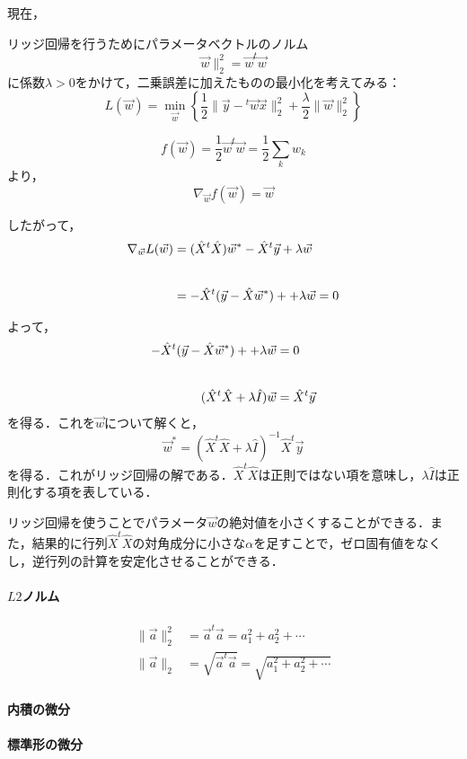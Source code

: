 現在，

リッジ回帰を行うためにパラメータベクトルのノルム
\begin{equation}
    \vec{w}\|^2_2 = \vec{w}^t\vec{w}
\end{equation}
に係数$\lambda > 0$をかけて，二乗誤差に加えたものの最小化を考えてみる：
\begin{equation}
    L(\vec{w}) =
    \min_{\vec{w}}
    \left\{
        \frac{1}{2}\|\vec{y}-{}^t\vec{w}\vec{x}\|^2_2 + \frac{\lambda}{2}\|\vec{w}\|^2_2
    \right\}
\end{equation}


\begin{equation}
    f(\vec{w}) = \frac{1}{2}\vec{w}^t\vec{w}
    = \frac{1}{2}\sum_k w_k
\end{equation}
より，
\begin{equation}
    \nabla_{\vec{w}}f(\vec{w}) = \vec{w}
\end{equation}

したがって，
\begin{align}
    \nabla_{\vec{w}}L(\vec{w})
    & = (\hat{X}^t\hat{X})\vec{w}^\ast 
    - \hat{X}^t\vec{y}
    +\lambda\vec{w}\notag \\\\[5pt]
    & = -\hat{X}^t (\vec{y} - \hat{X}\vec{w}^\ast)
    + +\lambda\vec{w} = 0
\end{align}

よって，
\begin{align}
    -\hat{X}^t (\vec{y} - \hat{X}\vec{w}^\ast)
    + +\lambda\vec{w} &= 0\notag \\\\[5pt]
    (\hat{X}^t\hat{X}
     +\lambda\hat{I})\vec{w} &= \hat{X}^t \vec{y}
\end{align}
を得る．これを$\vec{w}$について解くと，
\begin{equation}
    \vec{w}^\ast = (\hat{X}^t\hat{X}
    +\lambda\hat{I})^{-1}\hat{X}^t \vec{y}
\end{equation}
を得る．これがリッジ回帰の解である．$\hat{X}^t\hat{X}$は正則ではない項を意味し，$\lambda\hat{I}$は正則化する項を表している．

リッジ回帰を使うことでパラメータ$\vec{w}$の絶対値を小さくすることができる．また，結果的に行列$\hat{X}^t\hat{X}$の対角成分に小さな$\alpha$を足すことで，ゼロ固有値をなくし，逆行列の計算を安定化させることができる．






\paragraph*{$L2$ノルム}
\begin{align}
    \|\vec{a}\|^2_2 &= \vec{a}^t\vec{a} = a_1^2 + a_2^2 + \cdots\\[10pt]
    \|\vec{a}\|_2 &= \sqrt{\vec{a}^t\vec{a}} = \sqrt{a_1^2 + a_2^2 + \cdots}
\end{align}

\paragraph*{内積の微分}

\paragraph*{標準形の微分}


